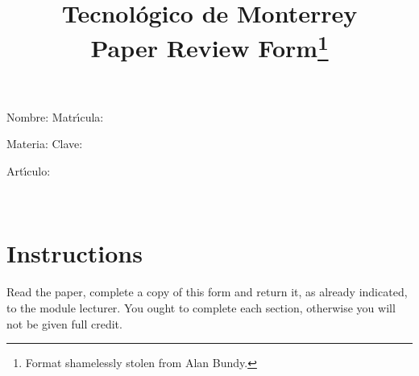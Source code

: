 \documentclass{article}
\title{Tecnol\'ogico de Monterrey\\
Paper Review Form\thanks{
Format shamelessly stolen from Alan Bundy.}}
\author{}
\date{}
\begin{document}
\maketitle
\vspace{-2cm}


\begin{description}
\item Nombre:  \hspace{0.30in}
Matr\'{\i}cula: 
\item Materia:  \hspace{0.30in}
Clave: 
\item Art\'{\i}culo:
\begin{mdframed}
\\
\parencite{Barkas2019}
\end{mdframed}
\end{description}


\section*{Instructions} 

{\small Read the paper, complete a copy of this form and return it,
as already indicated, to the module lecturer. You ought to complete each 
section, otherwise you will not be given full credit.}
\end{document}
